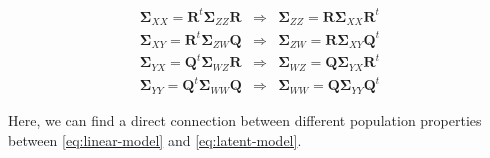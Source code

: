 \documentclass[12pt,A4paper,authoryear]{elsarticle} %
\begin{document}
\begin{equation}
  \begin{matrix}
    \boldsymbol{\Sigma}_{XX} = \mathbf{R}^t \boldsymbol{\Sigma}_{ZZ} \mathbf{R} & \Rightarrow & \boldsymbol{\Sigma}_{ZZ} = \mathbf{R} \boldsymbol{\Sigma}_{XX} \mathbf{R}^t \\
    \boldsymbol{\Sigma}_{XY} = \mathbf{R}^t \boldsymbol{\Sigma}_{ZW} \mathbf{Q} & \Rightarrow & \boldsymbol{\Sigma}_{ZW} = \mathbf{R} \boldsymbol{\Sigma}_{XY} \mathbf{Q}^t \\
    \boldsymbol{\Sigma}_{YX} = \mathbf{Q}^t \boldsymbol{\Sigma}_{WZ} \mathbf{R} & \Rightarrow & \boldsymbol{\Sigma}_{WZ} = \mathbf{Q} \boldsymbol{\Sigma}_{YX} \mathbf{R}^t \\
    \boldsymbol{\Sigma}_{YY} = \mathbf{Q}^t \boldsymbol{\Sigma}_{WW} \mathbf{Q} & \Rightarrow & \boldsymbol{\Sigma}_{WW} = \mathbf{Q} \boldsymbol{\Sigma}_{YY} \mathbf{Q}^t
  \end{matrix}
  \label{eq:cov-yx-wz}
\end{equation}

Here, we can find a direct connection between different population
properties between \eqref{eq:linear-model} and \eqref{eq:latent-model}.
\end{document}
